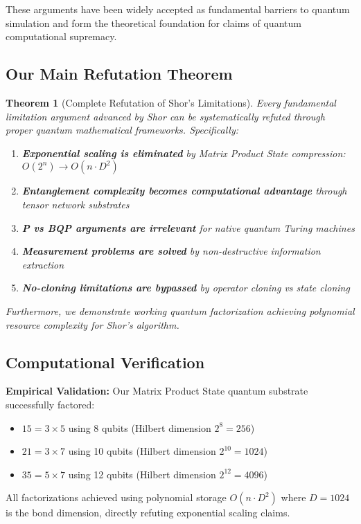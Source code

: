 \documentclass[12pt]{article}
\newtheorem{theorem}{Theorem}[section]
\begin{document}
These arguments have been widely accepted as fundamental barriers to quantum simulation and form the theoretical foundation for claims of quantum computational supremacy.

\subsection{Our Main Refutation Theorem}

\begin{theorem}[Complete Refutation of Shor's Limitations]
Every fundamental limitation argument advanced by Shor can be systematically refuted through proper quantum mathematical frameworks. Specifically:
\begin{enumerate}
\item \textbf{Exponential scaling is eliminated} by Matrix Product State compression: $O(2^n) \rightarrow O(n \cdot D^2)$
\item \textbf{Entanglement complexity becomes computational advantage} through tensor network substrates
\item \textbf{P vs BQP arguments are irrelevant} for native quantum Turing machines
\item \textbf{Measurement problems are solved} by non-destructive information extraction
\item \textbf{No-cloning limitations are bypassed} by operator cloning vs state cloning
\end{enumerate}
Furthermore, we demonstrate working quantum factorization achieving polynomial resource complexity for Shor's algorithm.
\end{theorem}

\subsection{Computational Verification}

\textbf{Empirical Validation:} Our Matrix Product State quantum substrate successfully factored:
\begin{itemize}
\item $15 = 3 \times 5$ using 8 qubits (Hilbert dimension $2^8 = 256$)
\item $21 = 3 \times 7$ using 10 qubits (Hilbert dimension $2^{10} = 1024$)
\item $35 = 5 \times 7$ using 12 qubits (Hilbert dimension $2^{12} = 4096$)
\end{itemize}

All factorizations achieved using polynomial storage $O(n \cdot D^2)$ where $D = 1024$ is the bond dimension, directly refuting exponential scaling claims.
\end{document}
